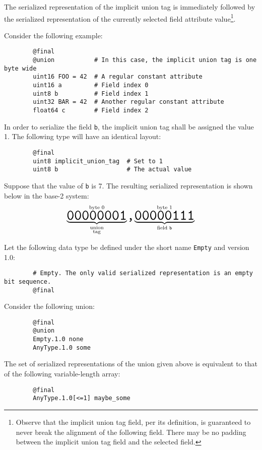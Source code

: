 The serialized representation of the implicit union tag is immediately followed by
the serialized representation of the currently selected field attribute value\footnote{%
    Observe that the implicit union tag field, per its definition,
    is guaranteed to never break the alignment of the following field.
    There may be no padding between the implicit union tag field and the selected field.
}.

\begin{remark}
    Consider the following example:

    \begin{verbatim}
        @final
        @union           # In this case, the implicit union tag is one byte wide
        uint16 FOO = 42  # A regular constant attribute
        uint16 a         # Field index 0
        uint8 b          # Field index 1
        uint32 BAR = 42  # Another regular constant attribute
        float64 c        # Field index 2
    \end{verbatim}

    In order to serialize the field \verb|b|, the implicit union tag shall be assigned the value 1.
    The following type will have an identical layout:

    \begin{verbatim}
        @final
        uint8 implicit_union_tag  # Set to 1
        uint8 b                   # The actual value
    \end{verbatim}

    Suppose that the value of \verb|b| is 7.
    The resulting serialized representation is shown below in the base-2 system:
    $$%
    \overset{\text{byte 0}}{%
        \underbrace{\hugett{00000001}}_{\substack{\text{union} \\ \text{tag}}}%
    }%
    \hugett{,}%
    \overset{\text{byte 1}}{%
        \underbrace{\hugett{00000111}}_{\text{field }\texttt{b}}%
    }
    $$

\end{remark}

\begin{remark}
    Let the following data type be defined under the short name \verb|Empty| and version 1.0:

    \begin{verbatim}
        # Empty. The only valid serialized representation is an empty bit sequence.
        @final
    \end{verbatim}

    Consider the following union:

    \begin{verbatim}
        @final
        @union
        Empty.1.0 none
        AnyType.1.0 some
    \end{verbatim}

    The set of serialized representations of the union given above is equivalent to
    that of the following variable-length array:

    \begin{verbatim}
        @final
        AnyType.1.0[<=1] maybe_some
    \end{verbatim}
\end{remark}


